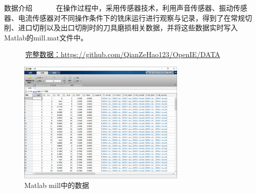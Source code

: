 \begin{frame}{数据介绍}
\ \ \ \ \ \ 在操作过程中，采用传感器技术，利用声音传感器、振动传感器、电流传感器对不同操作条件下的铣床运行进行观察与记录，得到了在常规切削、进口切削以及出口切削时的刀具磨损相关数据，并将这些数据实时写入Matlab的mill.mat文件中。\par
\ \ \ \ \ \ \href{https://github.com/QianZeHao123/OpenIE/tree/main/nc_machining_center/DATA}{完整数据：https://github.com/QianZeHao123/OpenIE/DATA}\par
% 
\begin{figure}[htp]
    \centering
    \includegraphics[width=8cm]{刀具磨损量预测神经网络/mill.png}
    \caption{Matlab mill中的数据}
\end{figure}
% 
\end{frame} 
% 
% 
% 
